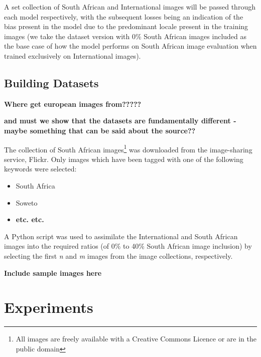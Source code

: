 \documentclass[conference]{IEEEtran}
\begin{document}
A set collection of South African and International images will be passed through each model respectively, with the subsequent losses being an indication of the bias present in the model due to the predominant locale present in the training images (we take the dataset version with 0\% South African images included as the base case of how the model performs on South African image evaluation when trained exclusively on International images).

\subsection{Building Datasets}

\textbf{Where get european images from?????}

\textbf{and must we show that the datasets are fundamentally different - maybe something that can be said about the source??}

The collection of South African images\footnote{All images are freely available with a Creative Commons Licence or are in the public domain} was downloaded from the image-sharing service, Flickr. Only images which have been tagged with one of the following keywords were selected:

\begin{itemize}
	\item South Africa
	\item Soweto
	\item \textbf{etc. etc.}
\end{itemize}

A Python script was used to assimilate the International and South African images into the required ratios (of 0\% to 40\% South African image inclusion) by selecting the first \emph{n} and \emph{m} images from the image collections, respectively.

\textbf{Include sample images here}

\section{Experiments}

%
%
%
%
%
\end{document}
